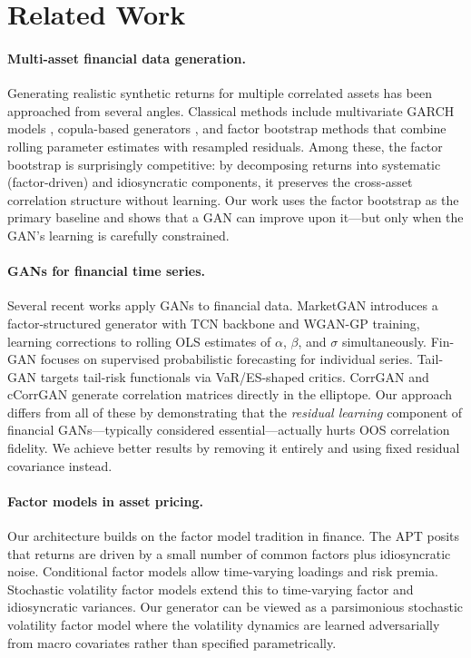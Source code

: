 \section{Related Work}
\label{sec:related}

\paragraph{Multi-asset financial data generation.}
Generating realistic synthetic returns for multiple correlated assets has been approached from several angles. 
Classical methods include multivariate GARCH models \citep{engle2002dynamic, bollerslev1988capital}, copula-based generators \citep{marti2020corrgan, marti2021ccorrgan}, and factor bootstrap methods that combine rolling parameter estimates with resampled residuals. 
Among these, the factor bootstrap is surprisingly competitive: by decomposing returns into systematic (factor-driven) and idiosyncratic components, it preserves the cross-asset correlation structure without learning. 
Our work uses the factor bootstrap as the primary baseline and shows that a GAN can improve upon it---but only when the GAN's learning is carefully constrained.

\paragraph{GANs for financial time series.}
Several recent works apply GANs to financial data. 
MarketGAN \citep{huh2026marketgans} introduces a factor-structured generator with TCN backbone and WGAN-GP training, learning corrections to rolling OLS estimates of $\alpha$, $\beta$, and $\sigma$ simultaneously. 
Fin-GAN \citep{vuletic2023fingen} focuses on supervised probabilistic forecasting for individual series. 
Tail-GAN \citep{cont2025tailgan} targets tail-risk functionals via VaR/ES-shaped critics. 
CorrGAN \citep{marti2020corrgan} and cCorrGAN \citep{marti2021ccorrgan} generate correlation matrices directly in the elliptope. 
Our approach differs from all of these by demonstrating that the \emph{residual learning} component of financial GANs---typically considered essential---actually hurts OOS correlation fidelity. 
We achieve better results by removing it entirely and using fixed residual covariance instead.

\paragraph{Factor models in asset pricing.}
Our architecture builds on the factor model tradition in finance. 
The APT \citep{ross1976arbitrage} posits that returns are driven by a small number of common factors plus idiosyncratic noise. 
Conditional factor models \citep{kelly2019characteristics} allow time-varying loadings and risk premia. 
Stochastic volatility factor models \citep{pitt1999time, lopes2007factor} extend this to time-varying factor and idiosyncratic variances. 
Our generator can be viewed as a parsimonious stochastic volatility factor model where the volatility dynamics are learned adversarially from macro covariates rather than specified parametrically.

